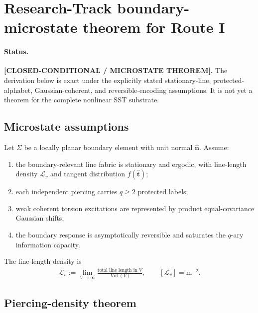 
\section{Research-Track boundary-microstate theorem for Route I}
\label{sec:rt_routeI_microstates_v004}

\paragraph{Status.}
\textbf{[CLOSED-CONDITIONAL / MICROSTATE THEOREM].}
The derivation below is exact under the explicitly stated stationary-line,
protected-alphabet, Gaussian-coherent, and reversible-encoding assumptions.
It is not yet a theorem for the complete nonlinear SST substrate.

\subsection{Microstate assumptions}

Let $\Sigma$ be a locally planar boundary element with unit normal
$\widehat{\mathbf n}$. Assume:
\begin{enumerate}
    \item the boundary-relevant line fabric is stationary and ergodic, with
    line-length density $\mathcal L_v$ and tangent distribution
    $f(\widehat{\mathbf t})$;
    \item each independent piercing carries $q\ge2$ protected labels;
    \item weak coherent torsion excitations are represented by product
    equal-covariance Gaussian shifts;
    \item the boundary response is asymptotically reversible and saturates
    the $q$-ary information capacity.
\end{enumerate}

The line-length density is
\begin{align}
    \mathcal L_v
    :=
    \lim_{V\to\infty}
    \frac{\text{total line length in }V}{\operatorname{Vol}(V)},
    \qquad
    [\mathcal L_v]=\mathrm{m^{-2}}.
\end{align}

\subsection{Piercing-density theorem}

